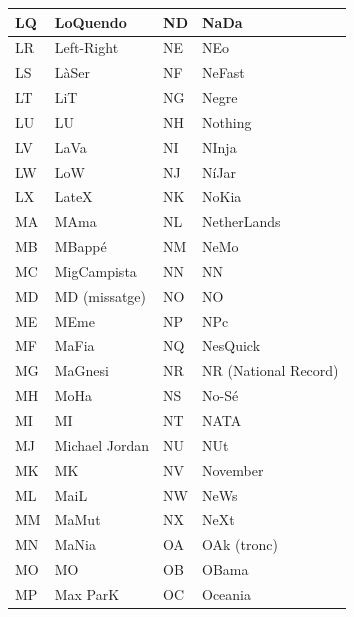 \begin{table}[ht]
    \centering
    \begin{tabular}{|l|l|l|l|}
        \hline
        LQ & LoQuendo       & ND & NaDa                 \\ \hline
        LR & Left-Right     & NE & NEo                  \\ \hline
        LS & LàSer          & NF & NeFast               \\ \hline
        LT & LiT            & NG & Negre                \\ \hline
        LU & LU             & NH & Nothing              \\ \hline
        LV & LaVa           & NI & NInja                \\ \hline
        LW & LoW            & NJ & NíJar                \\ \hline
        LX & LateX          & NK & NoKia                \\ \hline
        MA & MAma           & NL & NetherLands          \\ \hline
        MB & MBappé         & NM & NeMo                 \\ \hline
        MC & MigCampista    & NN & NN                   \\ \hline
        MD & MD (missatge)  & NO & NO                   \\ \hline
        ME & MEme           & NP & NPc                  \\ \hline
        MF & MaFia          & NQ & NesQuick             \\ \hline
        MG & MaGnesi        & NR & NR (National Record) \\ \hline
        MH & MoHa           & NS & No-Sé                \\ \hline
        MI & MI             & NT & NATA                 \\ \hline
        MJ & Michael Jordan & NU & NUt                  \\ \hline
        MK & MK             & NV & November             \\ \hline
        ML & MaiL           & NW & NeWs                 \\ \hline
        MM & MaMut          & NX & NeXt                 \\ \hline
        MN & MaNia          & OA & OAk (tronc)          \\ \hline
        MO & MO             & OB & OBama                \\ \hline
        MP & Max ParK       & OC & Oceania              \\ \hline

\end{tabular}
\end{table}
